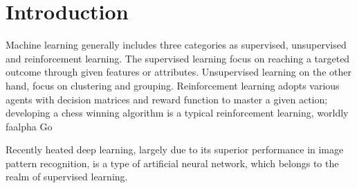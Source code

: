 \section{Introduction}

Machine learning generally includes three categories as supervised, unsupervised and reinforcement learning. The supervised learning focus on reaching a targeted outcome through given features or attributes. Unsupervised learning on the other hand, focus on clustering and grouping. Reinforcement learning adopts various agents with decision matrices and reward function to master a given action; developing a chess winning algorithm is a typical reinforcement learning, worldly faalpha Go
\par
Recently heated deep learning, largely due to its superior performance in image pattern recognition, is a type of artificial neural network, which belongs to the realm of supervised learning. 
